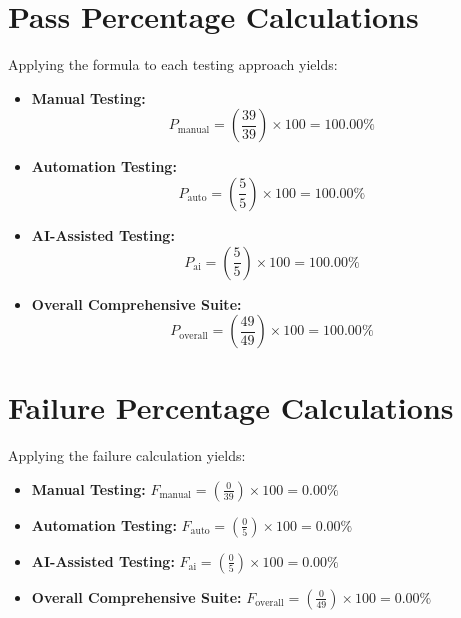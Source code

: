 \documentclass{InternshipReport}
\begin{document}
\section{Pass Percentage Calculations}
Applying the formula to each testing approach yields:
\begin{itemize}
    \item \textbf{Manual Testing:}
    \begin{equation}
    P_{\text{manual}} = \left( \frac{39}{39} \right) \times 100 = 100.00\%
    \end{equation}
    
    \item \textbf{Automation Testing:}
    \begin{equation}
    P_{\text{auto}} = \left( \frac{5}{5} \right) \times 100 = 100.00\%
    \end{equation}
    
    \item \textbf{AI-Assisted Testing:}
    \begin{equation}
    P_{\text{ai}} = \left( \frac{5}{5} \right) \times 100 = 100.00\%
    \end{equation}
    
    \item \textbf{Overall Comprehensive Suite:}
    \begin{equation}
    P_{\text{overall}} = \left( \frac{49}{49} \right) \times 100 = 100.00\%
    \end{equation}
\end{itemize}

\section{Failure Percentage Calculations}
Applying the failure calculation yields:
\begin{itemize}
    \item \textbf{Manual Testing:} $F_{\text{manual}} = \left( \frac{0}{39} \right) \times 100 = 0.00\%$
    \item \textbf{Automation Testing:} $F_{\text{auto}} = \left( \frac{0}{5} \right) \times 100 = 0.00\%$
    \item \textbf{AI-Assisted Testing:} $F_{\text{ai}} = \left( \frac{0}{5} \right) \times 100 = 0.00\%$
    \item \textbf{Overall Comprehensive Suite:} $F_{\text{overall}} = \left( \frac{0}{49} \right) \times 100 = 0.00\%$
\end{itemize}
\end{document}
